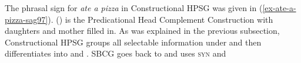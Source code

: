 \documentclass[output=paper
	        ,collection
	        ,collectionchapter
 	        ,biblatex
                ,babelshorthands
                ,newtxmath
                ,draftmode
                ,colorlinks, citecolor=brown
]{langscibook}
\begin{document}

The phrasal sign for \emph{ate a pizza} in Constructional HPSG was given in
(\ref{ex-ate-a-pizza-sag97}). () is the Predicational Head Complement Construction with
daughters and mother filled in.
\ea
\label{feat-geom-sag2012}
\z
As was explained in the previous subsection, Constructional HPSG groups all selectable information under
\synsem and then differentiates into \cat and \cont. SBCG goes back to  and uses \textsc{syn} and
\end{document}
